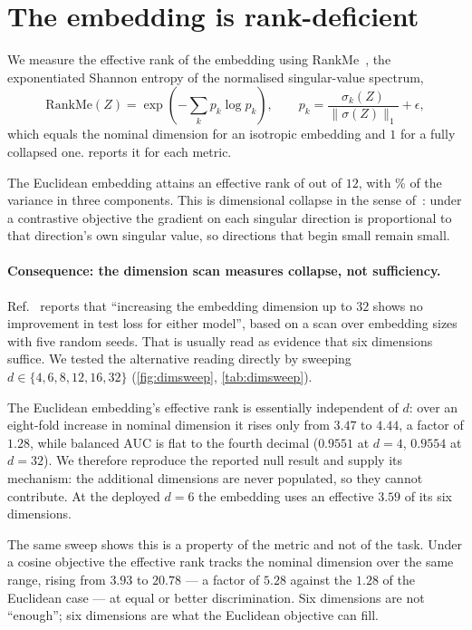 \documentclass[11pt]{article}
\begin{document}
\section{The embedding is rank-deficient}
\label{sec:collapse}

We measure the effective rank of the embedding using
RankMe~\cite{rankme}, the exponentiated Shannon entropy of the normalised
singular-value spectrum,
\begin{equation}
\mathrm{RankMe}(Z) = \exp\!\left(-\sum_k p_k \log p_k\right),
\qquad p_k = \frac{\sigma_k(Z)}{\lVert \sigma(Z)\rVert_1} + \epsilon ,
\end{equation}
which equals the nominal dimension for an isotropic embedding and $1$ for a fully
collapsed one.  reports it for each metric.

The Euclidean embedding attains an effective rank of \RankMeEucl{} out of $12$,
with \VarTopThree\% of the variance in three components. This is dimensional
collapse in the sense of~\cite{jing2022}: under a contrastive objective the
gradient on each singular direction is proportional to that direction's own
singular value, so directions that begin small remain small.

\paragraph{Consequence: the dimension scan measures collapse, not sufficiency.}
Ref.~\cite{dp2025048} reports that ``increasing the embedding dimension up to
$32$ shows no improvement in test loss for either model'', based on a scan over
embedding sizes with five random seeds. That is usually read as evidence that six
dimensions suffice. We tested the alternative reading directly by sweeping
$d \in \{4,6,8,12,16,32\}$ (\cref{fig:dimsweep}, \cref{tab:dimsweep}).

The Euclidean embedding's effective rank is essentially independent of $d$:
over an eight-fold increase in nominal dimension it rises only from $3.47$ to
$4.44$, a factor of $1.28$, while balanced AUC is flat to the fourth decimal
($0.9551$ at $d=4$, $0.9554$ at $d=32$). We therefore reproduce the reported null
result and supply its mechanism: the additional dimensions are never populated,
so they cannot contribute. At the deployed $d=6$ the embedding uses an effective
$3.59$ of its six dimensions.

The same sweep shows this is a property of the metric and not of the task. Under
a cosine objective the effective rank tracks the nominal dimension over the same
range, rising from $3.93$ to $20.78$ --- a factor of $5.28$ against the $1.28$ of
the Euclidean case --- at equal or better discrimination. Six dimensions are not
``enough''; six dimensions are what the Euclidean objective can fill.
\end{document}
